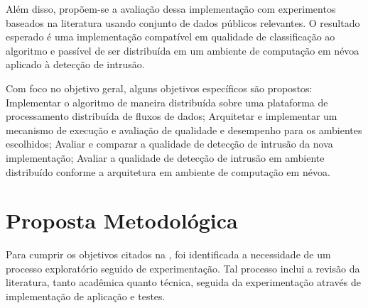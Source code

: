 Além disso, propõem-se a avaliação dessa implementação com experimentos
baseados na literatura usando conjunto de dados públicos relevantes.
O resultado esperado é uma implementação compatível em qualidade de
classificação ao algoritmo \minas e passível de ser distribuída em um ambiente de
computação em névoa aplicado à detecção de intrusão.

Com foco no objetivo geral, alguns objetivos específicos são propostos:
Implementar o algoritmo \minas de maneira distribuída sobre uma plataforma de
processamento distribuída de fluxos de dados;
Arquitetar e implementar um mecanismo de execução e avaliação de qualidade e
desempenho para os ambientes escolhidos;
Avaliar e comparar a qualidade de detecção de intrusão da nova implementação;
Avaliar a qualidade de detecção de intrusão em ambiente distribuído conforme a
arquitetura \arch em ambiente de computação em névoa.



\section{Proposta Metodológica}

Para cumprir os objetivos citados na , foi identificada a necessidade
de um processo exploratório seguido de experimentação. Tal processo inclui a
revisão da literatura, tanto acadêmica quanto técnica, seguida da experimentação
através de implementação de aplicação e testes.

